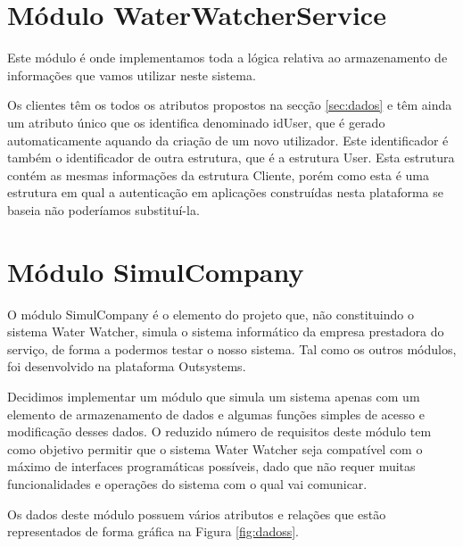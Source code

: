\section{Módulo WaterWatcherService} \label{modwws} %
Este módulo é onde implementamos toda a lógica relativa ao armazenamento de informações que vamos utilizar neste sistema.\par
Os clientes têm os todos os atributos propostos na secção \ref{sec:dados} e têm ainda um atributo único que os identifica denominado idUser, que é gerado automaticamente aquando da criação de um novo utilizador. Este identificador é também o identificador de outra estrutura, que é a estrutura User. Esta estrutura contém as mesmas informações da estrutura Cliente, porém como esta é uma estrutura em qual a autenticação em aplicações construídas nesta plataforma se baseia \cite{outsusers} não poderíamos substituí-la.

\section{Módulo SimulCompany} \label{modsc} %
O módulo SimulCompany é o elemento do projeto que, não constituindo o sistema Water Watcher, simula o sistema informático da empresa prestadora do serviço, de forma a podermos testar o nosso sistema. Tal como os outros módulos, foi desenvolvido na plataforma Outsystems.\par
Decidimos implementar um módulo que simula um sistema apenas com um elemento de armazenamento de dados e algumas funções simples de acesso e modificação desses dados. O reduzido número de requisitos deste módulo tem como objetivo permitir que o sistema Water Watcher seja compatível com o máximo de interfaces programáticas possíveis, dado que não requer muitas funcionalidades e operações do sistema com o qual vai comunicar.\par
Os dados deste módulo possuem vários atributos e relações que estão representados de forma gráfica na Figura \ref{fig:dadoss}.



